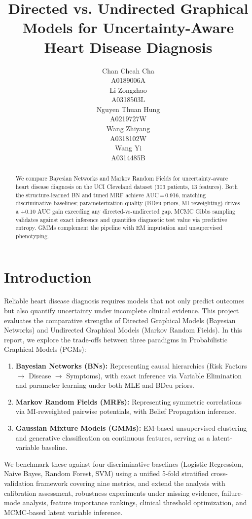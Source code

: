 \documentclass{article}
\title{Directed vs. Undirected Graphical Models for Uncertainty-Aware Heart Disease Diagnosis}
\author{
  Chan Cheah Cha \\
  A0189006A \\
  \And
  Li Zongzhao \\
  A0318503L \\
  \And
  Nguyen Thuan Hung \\
  A0219727W \\
  \And
  Wang Zhiyang \\
  A0318102W \\
  \And
  Wang Yi \\
  A0314485B \\
}
\begin{document}
\maketitle

\begin{abstract}
    We compare Bayesian Networks and Markov Random Fields for uncertainty-aware heart disease diagnosis on the UCI Cleveland dataset (303 patients, 13 features). Both the structure-learned BN and tuned MRF achieve AUC\,=\,0.916, matching discriminative baselines; parameterization quality (BDeu priors, MI reweighting) drives a +0.10 AUC gain exceeding any directed-vs-undirected gap. MCMC Gibbs sampling validates against exact inference and quantifies diagnostic test value via predictive entropy. GMMs complement the pipeline with EM imputation and unsupervised phenotyping.
\end{abstract}

\section{Introduction}
  Reliable heart disease diagnosis requires models that not only predict
  outcomes but also quantify uncertainty under incomplete clinical evidence.
  This project evaluates the comparative strengths of Directed Graphical
  Models (Bayesian Networks) and Undirected Graphical Models (Markov Random
  Fields). In this report, we explore the trade-offs between
  three paradigms in Probabilistic Graphical Models (PGMs):
  \begin{enumerate}
      \item \textbf{Bayesian Networks (BNs):} Representing causal hierarchies
            (Risk Factors $\rightarrow$ Disease $\rightarrow$ Symptoms), with
            exact inference via Variable Elimination and parameter learning
            under both MLE and BDeu priors.
      \item \textbf{Markov Random Fields (MRFs):} Representing symmetric
            correlations via MI-reweighted pairwise potentials, with Belief
            Propagation inference.
      \item \textbf{Gaussian Mixture Models (GMMs):} EM-based unsupervised
            clustering and generative classification on continuous features,
            serving as a latent-variable baseline.
  \end{enumerate}
  We benchmark these against four discriminative baselines (Logistic
  Regression, Naive Bayes, Random Forest, SVM) using a unified 5-fold
  stratified cross-validation framework covering nine metrics, and extend
  the analysis with calibration assessment, robustness experiments under
  missing evidence, failure-mode analysis, feature importance rankings,
  clinical threshold optimization, and MCMC-based latent variable inference.
\end{document}
